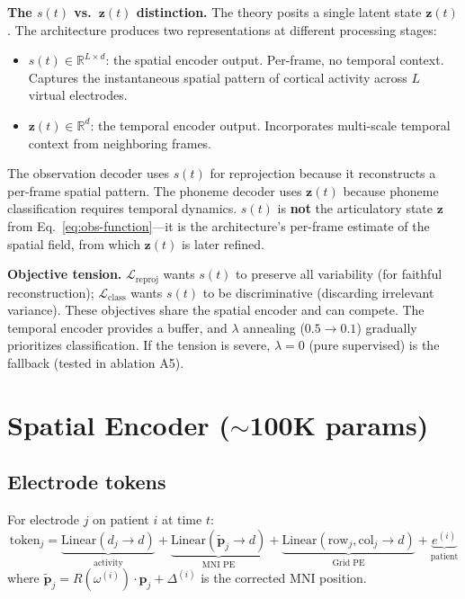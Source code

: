 \documentclass[11pt,letterpaper]{article}
\newcommand{\bfp}{\mathbf{p}}
\newcommand{\bfz}{\mathbf{z}}
\newcommand{\R}{\mathbb{R}}
\begin{document}
\textbf{The $s(t)$ vs.\ $\bfz(t)$ distinction.} The theory posits a single latent state $\bfz(t)$. The architecture produces two representations at different processing stages:
\begin{itemize}[leftmargin=2em]
\item $s(t) \in \R^{L \times d}$: the spatial encoder output. Per-frame, no temporal context. Captures the instantaneous spatial pattern of cortical activity across $L$ virtual electrodes.
\item $\bfz(t) \in \R^d$: the temporal encoder output. Incorporates multi-scale temporal context from neighboring frames.
\end{itemize}

The observation decoder uses $s(t)$ for reprojection because it reconstructs a per-frame spatial pattern. The phoneme decoder uses $\bfz(t)$ because phoneme classification requires temporal dynamics. $s(t)$ is \textbf{not} the articulatory state $\bfz$ from Eq.~\eqref{eq:obs-function}---it is the architecture's per-frame estimate of the spatial field, from which $\bfz(t)$ is later refined.

\textbf{Objective tension.} $\mathcal{L}_{\text{reproj}}$ wants $s(t)$ to preserve all variability (for faithful reconstruction); $\mathcal{L}_{\text{class}}$ wants $s(t)$ to be discriminative (discarding irrelevant variance). These objectives share the spatial encoder and can compete. The temporal encoder provides a buffer, and $\lambda$ annealing ($0.5 \to 0.1$) gradually prioritizes classification. If the tension is severe, $\lambda{=}0$ (pure supervised) is the fallback (tested in ablation A5).


\section{Spatial Encoder (\texorpdfstring{${\sim}$100K}{~100K} params)}

\subsection{Electrode tokens}

For electrode $j$ on patient $i$ at time $t$:
\begin{equation}
\text{token}_j = \underbrace{\text{Linear}(d_j \to d)}_{\text{activity}} + \underbrace{\text{Linear}(\tilde{\bfp}_j \to d)}_{\text{MNI PE}} + \underbrace{\text{Linear}(\text{row}_j, \text{col}_j \to d)}_{\text{Grid PE}} + \underbrace{e^{(i)}}_{\text{patient}}
\end{equation}
where $\tilde{\bfp}_j = R(\omega^{(i)}) \cdot \bfp_j + \Delta^{(i)}$ is the corrected MNI position.
\end{document}
